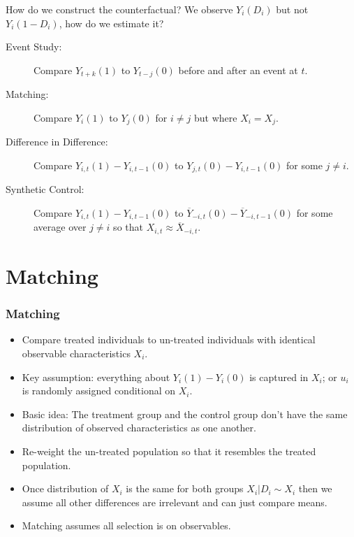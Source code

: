 \documentclass[aspectratio=169,11pt]{beamer}
\begin{document}
\begin{frame}{How do we construct the counterfactual?}
We observe $Y_i(D_i)$ but not $Y_i(1-D_i)$, how do we estimate it?\\

\begin{description}
  \item [Event Study:] Compare $Y_{t+k}(1)$ to $Y_{t-j}(0)$ before and after an event at $t$.
  \item [Matching:] Compare $Y_i(1)$ to $Y_j(0)$ for $i \neq j$ but where $X_i = X_j$.
  \item [Difference in Difference:] Compare $Y_{i,t}(1)-Y_{i,t-1}(0)$ to $Y_{j,t}(0)-Y_{i,t-1}(0)$  for some $j \neq i$.
  \item [Synthetic Control:] Compare $Y_{i,t}(1)-Y_{i,t-1}(0)$ to $\overline{Y}_{-i,t}(0)-\overline{Y}_{-i,t-1}(0)$ for some average over $j \neq i$ so that $X_{i,t} \approx \overline{X}_{-i,t}$.

\end{description}
\end{frame}

\section{Matching}

\begin{frame}
\frametitle{Matching}
\begin{itemize}
\item Compare treated individuals to un-treated individuals with identical observable characteristics $X_i$.
\item Key assumption: everything about $Y_i(1) - Y_i(0)$ is captured in $X_i$; or $u_i$ is randomly assigned conditional on $X_i$.
\item Basic idea: The treatment group and the control group don't have the same distribution of observed characteristics as one another. 
\item \alert{Re-weight} the un-treated population so that it resembles the treated population.
\item Once distribution of $X_i$ is the same for both groups $ X_i | D_i \sim X_i$ then we assume all other differences are irrelevant and can just compare means.
\item Matching assumes \alert{all selection is on observables}.
\end{itemize}
\end{frame}
\end{document}
